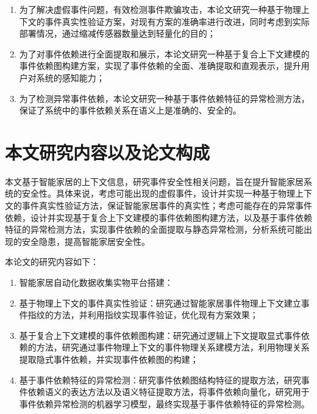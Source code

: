 \begin{enumerate}
	\item 为了解决虚假事件问题，有效检测事件欺骗攻击，本论文研究一种基于物理上下文的事件真实性验证方案，对现有方案的准确率进行改进，同时考虑到实际部署情况，通过缩减传感器数量达到轻量化的目的；
	\item 为了对事件依赖进行全面提取和展示，本论文研究一种基于复合上下文建模的事件依赖图构建方案，实现了事件依赖的全面、准确提取和直观表示，提升用户对系统的感知能力；
	\item 为了检测异常事件依赖，本论文研究一种基于事件依赖特征的异常检测方法，保证了系统中的事件依赖关系在语义上是准确的、安全的。
\end{enumerate}

\section{本文研究内容以及论文构成}

本文基于智能家居的上下文信息，研究事件安全性相关问题，旨在提升智能家居系统的安全性。具体来说，考虑可能出现的虚假事件，设计并实现一种基于物理上下文的事件真实性验证方法，保证智能家居事件的真实性；考虑可能存在的异常事件依赖，设计并实现基于复合上下文建模的事件依赖图构建方法，以及基于事件依赖特征的异常检测方法，实现事件依赖的全面提取与静态异常检测，分析系统可能出现的安全隐患，提高智能家居安全性。

本论文的研究内容如下：

\begin{enumerate}
	\item 智能家居自动化数据收集实物平台搭建：
	
	\item 基于物理上下文的事件真实性验证：研究通过智能家居事件物理上下文建立事件指纹的方法，并利用指纹实现事件验证，优化现有方案效果；
	\item 基于复合上下文建模的事件依赖图构建：研究通过逻辑上下文提取显式事件依赖的方法，研究通过事件物理上下文的事件物理关系建模方法，利用物理关系提取隐式事件依赖，并实现事件依赖图的构建；
	\item 基于事件依赖特征的异常检测：研究事件依赖图结构特征的提取方法，研究事件依赖语义的表达方法以及语义特征提取方法，将事件依赖向量化，研究用于事件依赖异常检测的机器学习模型，最终实现基于事件依赖特征的异常检测。
\end{enumerate}

